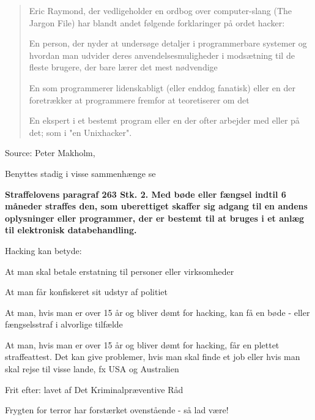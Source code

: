 \documentclass[20pt,landscape,a4paper,footrule]{foils}
\begin{document}

\begin{quote}
Eric Raymond, der vedligeholder en ordbog over computer-slang (The Jargon File) har blandt andet følgende forklaringer på ordet hacker:
\begin{list2}
\item En person, der nyder at undersøge detaljer i programmerbare systemer og hvordan man udvider deres anvendelsesmuligheder i modsætning til de fleste brugere, der bare lærer det mest nødvendige
\item En som programmerer lidenskabligt (eller enddog fanatisk) eller en der foretrækker at programmere fremfor at teoretiserer om det
\item En ekspert i et bestemt program eller en der ofter arbejder med eller på det; som i "en Unixhacker".
\end{list2}
\end{quote}

\begin{list1}
\item Source: Peter Makholm, 
\item Benyttes stadig i visse sammenhænge se 
\end{list1}



{\bfseries Straffelovens paragraf 263 Stk. 2. Med bøde eller fængsel
  indtil 6 måneder
straffes den, som uberettiget skaffer sig adgang til en andens
oplysninger eller programmer, der er bestemt til at bruges i et anlæg
til elektronisk databehandling.}

Hacking kan betyde:
\begin{list2}
\item At man skal betale erstatning til personer eller virksomheder
\item At man får konfiskeret sit udstyr af politiet
\item At man, hvis man er over 15 år og bliver dømt for hacking, kan
  få en bøde - eller fængselsstraf i alvorlige tilfælde
\item At man, hvis man er over 15 år og bliver dømt for hacking, får
en plettet straffeattest. Det kan give problemer, hvis man skal finde
et job eller hvis man skal rejse til visse lande, fx USA og
Australien
\item Frit efter:  lavet af Det
  Kriminalpræventive Råd
\item Frygten for terror har forstærket ovenstående - så lad være!
\end{list2}
\end{document}
